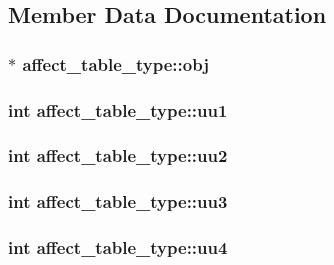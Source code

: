 \subsection{Member Data Documentation}
\hypertarget{structaffect__table__type_a44016d5bfa098899c9afa9bf397668a1}{
\subsubsection[{obj}]{$\ast$ affect\-\_\-table\-\_\-type\-::obj}}\label{structaffect__table__type_a44016d5bfa098899c9afa9bf397668a1}
\hypertarget{structaffect__table__type_a8c38c178a0ece5ef7d6fc112ad75bb90}{
\subsubsection[{uu1}]{\setlength{\rightskip}{0pt plus 5cm}int affect\-\_\-table\-\_\-type\-::uu1}}\label{structaffect__table__type_a8c38c178a0ece5ef7d6fc112ad75bb90}
\hypertarget{structaffect__table__type_a22a0b69158737bacc1bf91e61029717e}{
\subsubsection[{uu2}]{\setlength{\rightskip}{0pt plus 5cm}int affect\-\_\-table\-\_\-type\-::uu2}}\label{structaffect__table__type_a22a0b69158737bacc1bf91e61029717e}
\hypertarget{structaffect__table__type_aaa0866244c05c72d3df1eda5350d93e3}{
\subsubsection[{uu3}]{\setlength{\rightskip}{0pt plus 5cm}int affect\-\_\-table\-\_\-type\-::uu3}}\label{structaffect__table__type_aaa0866244c05c72d3df1eda5350d93e3}
\hypertarget{structaffect__table__type_a6b9c22c73d122493d36c039cce1e6e92}{
\subsubsection[{uu4}]{\setlength{\rightskip}{0pt plus 5cm}int affect\-\_\-table\-\_\-type\-::uu4}}\label{structaffect__table__type_a6b9c22c73d122493d36c039cce1e6e92}

